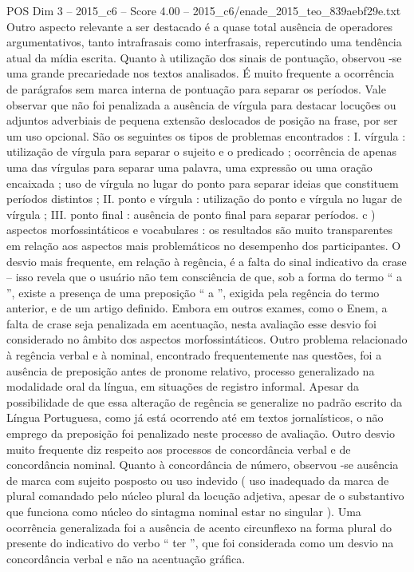 \begin{textsample}{POS Dim 3 – 2015\_c6 – Score 4.00 – 2015\_c6/enade\_2015\_teo\_839aebf29e.txt}
Outro aspecto relevante a ser destacado é a quase total ausência de operadores argumentativos, tanto intrafrasais como interfrasais, repercutindo uma tendência atual da mídia escrita.
Quanto à utilização dos sinais de pontuação, observou -se uma grande precariedade nos textos analisados.
É muito frequente a ocorrência de parágrafos sem marca interna de pontuação para separar os períodos.
Vale observar que não foi penalizada a ausência de vírgula para destacar locuções ou adjuntos adverbiais de pequena extensão deslocados de posição na frase, por ser um uso opcional.
São os seguintes os tipos de problemas encontrados : I. vírgula : utilização de vírgula para separar o sujeito e o predicado ; ocorrência de apenas uma das vírgulas para separar uma palavra, uma expressão ou uma oração encaixada ; uso de vírgula no lugar do ponto para separar ideias que constituem períodos distintos ; II. ponto e vírgula : utilização do ponto e vírgula no lugar de vírgula ; III. ponto final : ausência de ponto final para separar períodos. c ) aspectos morfossintáticos e vocabulares : os resultados são muito transparentes em relação aos aspectos mais problemáticos no desempenho dos participantes.
O desvio mais frequente, em relação à regência, é a falta do sinal indicativo da crase – isso revela que o usuário não tem consciência de que, sob a forma do termo “ a ”, existe a presença de uma preposição “ a ”, exigida pela regência do termo anterior, e de um artigo definido.
Embora em outros exames, como o Enem, a falta de crase seja penalizada em acentuação, nesta avaliação esse desvio foi considerado no âmbito dos aspectos morfossintáticos.
Outro problema relacionado à regência verbal e à nominal, encontrado frequentemente nas questões, foi a ausência de preposição antes de pronome relativo, processo generalizado na modalidade oral da língua, em situações de registro informal.
Apesar da possibilidade de que essa alteração de regência se generalize no padrão escrito da Língua Portuguesa, como já está ocorrendo até em textos jornalísticos, o não emprego da preposição foi penalizado neste processo de avaliação.
Outro desvio muito frequente diz respeito aos processos de concordância verbal e de concordância nominal.
Quanto à concordância de número, observou -se ausência de marca com sujeito posposto ou uso indevido ( uso inadequado da marca de plural comandado pelo núcleo plural da locução adjetiva, apesar de o substantivo que funciona como núcleo do sintagma nominal estar no singular ).
Uma ocorrência generalizada foi a ausência de acento circunflexo na forma plural do presente do indicativo do verbo “ ter ”, que foi considerada como um desvio na concordância verbal e não na acentuação gráfica.

\end{textsample}
